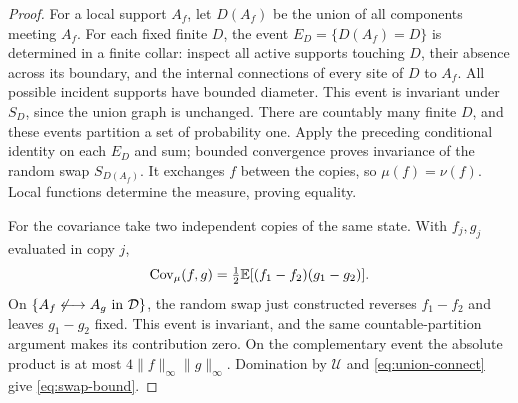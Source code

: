 \begin{proof}
For a local support $A_f$, let $D(A_f)$ be the union of all components meeting $A_f$. For each fixed finite $D$, the event $E_D=\{D(A_f)=D\}$ is determined in a finite collar: inspect all active supports touching $D$, their absence across its boundary, and the internal connections of every site of $D$ to $A_f$. All possible incident supports have bounded diameter. This event is invariant under $S_D$, since the union graph is unchanged. There are countably many finite $D$, and these events partition a set of probability one. Apply the preceding conditional identity on each $E_D$ and sum; bounded convergence proves invariance of the random swap $S_{D(A_f)}$. It exchanges $f$ between the copies, so $\mu(f)=\nu(f)$. Local functions determine the measure, proving equality.

For the covariance take two independent copies of the same state. With $f_j,g_j$ evaluated in copy $j$,
\[
 \operatorname{Cov}_\mu(f,g)=\tfrac12\mathbb E[(f_1-f_2)(g_1-g_2)].
\]
On $\{A_f\not\longleftrightarrow A_g\text{ in }\mathcal D\}$, the random swap just constructed reverses $f_1-f_2$ and leaves $g_1-g_2$ fixed. This event is invariant, and the same countable-partition argument makes its contribution zero. On the complementary event the absolute product is at most $4\|f\|_\infty\|g\|_\infty$. Domination by $\mathcal U$ and \eqref{eq:union-connect} give \eqref{eq:swap-bound}.
\end{proof}

